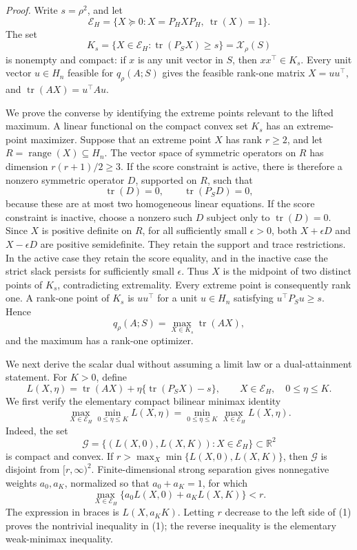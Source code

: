 \textit{Proof.}
Write \(s=\rho^2\), and let
\[
\mathcal E_H=\{X\succeq0:X=P_HXP_H,\ \operatorname{tr}(X)=1\}.
\]
The set
\[
K_s=\{X\in\mathcal E_H:\operatorname{tr}(P_SX)\geq s\}
=\mathcal X_\rho(S)
\]
is nonempty and compact: if \(x\) is any unit vector in \(S\), then \(xx^\top\in K_s\). Every unit vector \(u\in H_n\) feasible for \(q_\rho(A;S)\) gives the feasible rank-one matrix \(X=uu^\top\), and \(\operatorname{tr}(AX)=u^\top Au\).

We prove the converse by identifying the extreme points relevant to the lifted maximum. A linear functional on the compact convex set \(K_s\) has an extreme-point maximizer. Suppose that an extreme point \(X\) has rank \(r\geq2\), and let \(R=\operatorname{range}(X)\subseteq H_n\). The vector space of symmetric operators on \(R\) has dimension \(r(r+1)/2\geq3\). If the score constraint is active, there is therefore a nonzero symmetric operator \(D\), supported on \(R\), such that
\[
\operatorname{tr}(D)=0,
\qquad
\operatorname{tr}(P_SD)=0,
\]
because these are at most two homogeneous linear equations. If the score constraint is inactive, choose a nonzero such \(D\) subject only to \(\operatorname{tr}(D)=0\). Since \(X\) is positive definite on \(R\), for all sufficiently small \(\epsilon>0\), both \(X+\epsilon D\) and \(X-\epsilon D\) are positive semidefinite. They retain the support and trace restrictions. In the active case they retain the score equality, and in the inactive case the strict slack persists for sufficiently small \(\epsilon\). Thus \(X\) is the midpoint of two distinct points of \(K_s\), contradicting extremality. Every extreme point is consequently rank one. A rank-one point of \(K_s\) is \(uu^\top\) for a unit \(u\in H_n\) satisfying \(u^\top P_Su\geq s\). Hence
\[
q_\rho(A;S)=\max_{X\in K_s}\operatorname{tr}(AX),
\]
and the maximum has a rank-one optimizer.

We next derive the scalar dual without assuming a limit law or a dual-attainment statement. For \(K>0\), define
\[
L(X,\eta)=\operatorname{tr}(AX)+\eta\{\operatorname{tr}(P_SX)-s\},
\qquad X\in\mathcal E_H,\quad 0\leq\eta\leq K.
\]
We first verify the elementary compact bilinear minimax identity
\[
\max_{X\in\mathcal E_H}\min_{0\leq\eta\leq K}L(X,\eta)
=\min_{0\leq\eta\leq K}\max_{X\in\mathcal E_H}L(X,\eta).
\tag{1}
\]
Indeed, the set
\[
\mathcal G=\{(L(X,0),L(X,K)):X\in\mathcal E_H\}\subset\mathbb R^2
\]
is compact and convex. If \(r>\max_X\min\{L(X,0),L(X,K)\}\), then \(\mathcal G\) is disjoint from \([r,\infty)^2\). Finite-dimensional strong separation gives nonnegative weights \(a_0,a_K\), normalized so that \(a_0+a_K=1\), for which
\[
\max_{X\in\mathcal E_H}\{a_0L(X,0)+a_KL(X,K)\}<r.
\]
The expression in braces is \(L(X,a_KK)\). Letting \(r\) decrease to the left side of (1) proves the nontrivial inequality in (1); the reverse inequality is the elementary weak-minimax inequality.

